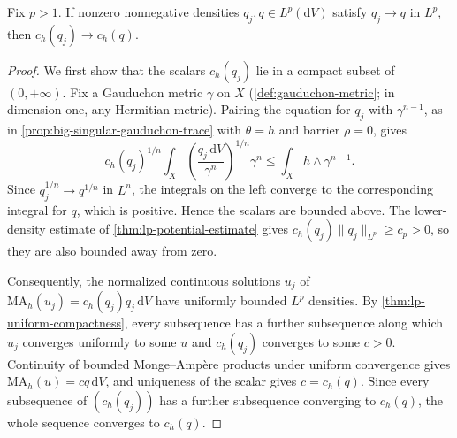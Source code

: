 \begin{lemma}\label{lem:lp-normalizer-continuity}
Fix $p>1$. If nonzero nonnegative densities $q_j,q\in L^p(\mathrm{d}V)$ satisfy $q_j\to q$ in $L^p$, then $c_h(q_j)\to c_h(q)$.
\end{lemma}
\begin{proof}
We first show that the scalars $c_h(q_j)$ lie in a compact subset of $(0,+\infty)$. Fix a Gauduchon metric $\gamma$ on $X$ (\cref{def:gauduchon-metric}; in dimension one, any Hermitian metric). Pairing the equation for $q_j$ with $\gamma^{n-1}$, as in \cref{prop:big-singular-gauduchon-trace} with $\theta=h$ and barrier $\rho=0$, gives
\[
 c_h(q_j)^{1/n}\int_X\left(\frac{q_j\,\mathrm{d}V}{\gamma^n}\right)^{1/n}\gamma^n
 \leq\int_Xh\wedge\gamma^{n-1}.
\]
Since $q_j^{1/n}\to q^{1/n}$ in $L^n$, the integrals on the left converge to the corresponding integral for $q$, which is positive. Hence the scalars are bounded above. The lower-density estimate of \cref{thm:lp-potential-estimate} gives $c_h(q_j)\|q_j\|_{L^p}\geq c_p>0$, so they are also bounded away from zero.

Consequently, the normalized continuous solutions $u_j$ of $\mathrm{MA}_h(u_j)=c_h(q_j)q_j\,\mathrm{d}V$ have uniformly bounded $L^p$ densities. By \cref{thm:lp-uniform-compactness}, every subsequence has a further subsequence along which $u_j$ converges uniformly to some $u$ and $c_h(q_j)$ converges to some $c>0$. Continuity of bounded Monge--Amp\`ere products under uniform convergence gives $\mathrm{MA}_h(u)=cq\,\mathrm{d}V$, and uniqueness of the scalar gives $c=c_h(q)$. Since every subsequence of $(c_h(q_j))$ has a further subsequence converging to $c_h(q)$, the whole sequence converges to $c_h(q)$.
\end{proof}

